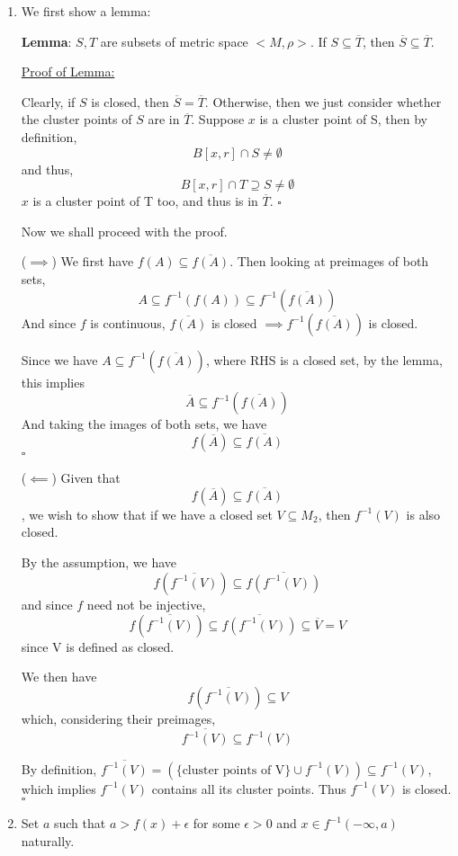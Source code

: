 \documentclass[11pt]{article}
\begin{document}
\begin{enumerate}
\item We first show a lemma:

\textbf{Lemma}: \(S, T\) are subsets of metric space \(<M, \rho>\). If
\(S \subseteq \overline{T}\), then \(\overline{S} \subseteq \overline{T}\).

\uline{Proof of Lemma:}

Clearly, if \(S\) is closed, then \(\overline{S} = \overline{T}\).
Otherwise, then we just consider whether the cluster points of \(S\) are in
\(\overline{T}\).
Suppose \(x\) is a cluster point of S, then by definition,
\[
   B[x, r] \cap S \neq \emptyset
   \]
and thus,
\[
   B[x, r] \cap T \supseteq S \neq \emptyset
   \]
\(x\) is a cluster point of T too, and thus is in \(\overline{T}\). \(\square\)

Now we shall proceed with the proof.

(\(\implies\)) We first have \(f(A) \subseteq \overline{f(A)}\). Then looking
at preimages of both sets,
\[
   A \subseteq f^{-1}(f(A)) \subseteq f^{-1}(\overline{f(A)})
   \]
And since \(f\) is continuous, \(\overline{f(A)}\) is closed \(\implies
   f^{-1}(\overline{f(A)})\) is closed.

Since we have \(A \subseteq f^{-1}(\overline{f(A)})\), where RHS is a closed set,
by the lemma, this implies
\[
   \overline{A} \subseteq f^{-1}(\overline{f(A)})
   \]
And taking the images of both sets, we have
 \[f(\overline{A}) \subseteq \overline{f(A)}\] \(\square\)

(\(\impliedby\)) Given that \[f(\overline{A}) \subseteq \overline{f(A)}\], we
wish to show that if we have a closed set \(V \subseteq M_2\), then
\(f^{-1}(V)\) is also closed.

By the assumption, we have
\[
   f(\overline{f^{-1}(V)}) \subseteq \overline{f(f^{-1}(V))}
   \]
and since \(f\) need not be injective,
\[
   f(\overline{f^{-1}(V)}) \subseteq \overline{f(f^{-1}(V))} \subseteq
   \overline{V} = V
   \]
since V is defined as closed.

We then have
\[
   f(\overline{f^{-1}(V)}) \subseteq V
   \]
which, considering their preimages,
\[
   \overline{f^{-1}(V)} \subseteq f^{-1}(V)
   \]

By definition, \(\overline{f^{-1}(V)} = (\{\text{cluster points of V}\} \cup f^{-1}(V))
   \subseteq f^{-1}(V)\),
which implies \(f^{-1}(V)\) contains all its cluster points. Thus
\(f^{-1}(V)\) is closed. \(\square\)

\item Set \(a\) such that \(a > f(x) + \epsilon\) for some \(\epsilon > 0\) and \(x
   \in f^{-1}(-\infty, a)\) naturally.


\end{enumerate}
\end{document}
